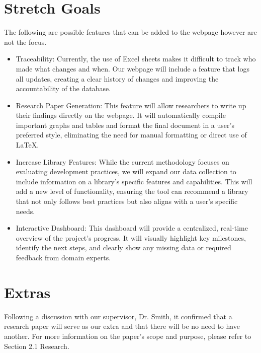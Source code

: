 \documentclass{article}
\begin{document}
\section{Stretch Goals}
The following are possible features that can be added to the webpage however are not the focus.
\begin{itemize}
    \item Traceability: Currently, the use of Excel sheets makes it difficult to track who made what changes and when. Our webpage will include a feature that logs all updates, creating a clear history of changes and improving the accountability of the database.
    \item Research Paper Generation: This feature will allow researchers to write up their findings directly on the webpage. It will automatically compile important graphs and tables and format the final document in a user's preferred style, eliminating the need for manual formatting or direct use of LaTeX.
    \item Increase Library Features: While the current methodology focuses on evaluating development practices, we will expand our data collection to include information on a library's specific features and capabilities. This will add a new level of functionality, ensuring the tool can recommend a library that not only follows best practices but also aligns with a user's specific needs.
    \item Interactive Dashboard: This dashboard will provide a centralized, real-time overview of the project's progress. It will visually highlight key milestones, identify the next steps, and clearly show any missing data or required feedback from domain experts.
\end{itemize}
\section{Extras}
Following a discussion with our supervisor, Dr. Smith, it confirmed that a research paper will serve as our extra and that there will be no need to have another.
For more information on the paper's scope and purpose, please refer to Section 2.1 Research.

\end{document}
